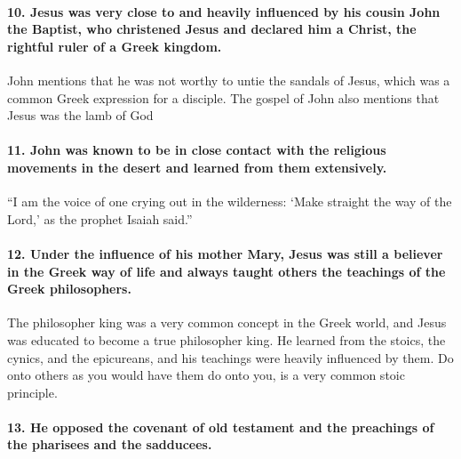 \paragraph{10.
Jesus was very close to and heavily influenced by his cousin John the Baptist, who christened Jesus and declared him a Christ, the rightful ruler of a Greek kingdom.}\label{par:jesus-was-very-close-to-and-heavily-influenced-by-his-cousin-john-the-baptist-who-christened-jesus-and-declared-him-a-christ-the-rightful-ruler-of-a-greek-kingdom.}

John mentions that he was not worthy to untie the sandals of Jesus, which was a common Greek expression for a disciple.
The gospel of John also mentions that Jesus was the lamb of God

\paragraph{11.
John was known to be in close contact with the religious movements in the desert and learned from them extensively.}\label{par:john-was-known-to-be-in-close-contact-with-the-religious-movements-in-the-desert-and-learned-from-them-extensively.}

``I am the voice of one crying out in the wilderness: `Make straight the way of the Lord,' as the prophet Isaiah said.''

\paragraph{12.
Under the influence of his mother Mary, Jesus was still a believer in the Greek way of life and always taught others the teachings of the Greek philosophers.}\label{par:under-the-influence-of-his-mother-mary-jesus-was-still-a-believer-in-the-greek-way-of-life-and-always-taught-others-the-teachings-of-the-greek-philosophers.}

The philosopher king was a very common concept in the Greek world, and Jesus was educated to become a true philosopher king.
He learned from the stoics, the cynics, and the epicureans, and his teachings were heavily influenced by them.
Do onto others as you would have them do onto you, is a very common stoic principle.

\paragraph{13.
He opposed the covenant of old testament and the preachings of the pharisees and the sadducees.}\label{par:he-opposed-the-covenant-of-old-testament-and-the-preachings-of-the-pharisees-and-the-sadducees.}

